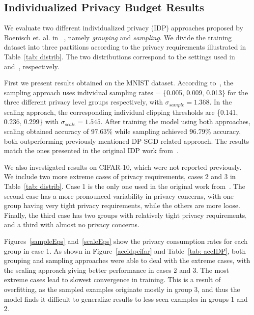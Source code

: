 \subsection{Individualized Privacy Budget Results}
We evaluate two different individualized privacy (IDP) approaches proposed by Boenisch et. al. in ~\cite{haveit}, namely {\em grouping} and {\em sampling}. We divide the training dataset into three partitions according to the privacy requirements illustrated in Table~\ref{tab: distrib}. The two distributions correspond to the settings used in~\cite{haveit} and~\cite{haveit2}, respectively. 

First we present results obtained on the MNIST dataset. 
According to~\cite{haveit}, the sampling approach uses individual sampling rates = \{0.005, 0.009, 0.013\} for the three different privacy level groups respectively, with $\sigma_{sample}=1.368$. In the scaling approach, the corresponding individual clipping thresholds are \{0.141, 0.236, 0.299\} with $\sigma_{scale}=1.545$. After training the model using both approaches, scaling obtained accuracy of $97.63$\% while sampling achieved $96.79$\% accuracy, both outperforming previously mentioned DP-SGD related approach. The results match the ones presented in the original IDP work from~\cite{haveit}.

We also investigated results on CIFAR-10, which were not reported previously. We include two more extreme cases of privacy requirements, cases 2 and 3 in Table~\ref{tab: distrib}. Case 1 is the only one used in the original work from~\cite{haveit}. The second case has a more pronounced variability in privacy concerns, with one group having very tight privacy requirements, while the others are more loose. Finally, the third case has two groups with relatively tight privacy requirements, and a third with almost no privacy concerns. 

Figures~\ref{sampleEps} and~\ref{scaleEps} show the privacy consumption rates for each group in case 1. As shown in Figure~\ref{accidpcifar} and Table~\ref{tab: accIDP}, both grouping and sampling approaches were able to deal with the extreme cases, with the scaling approach giving better performance in cases 2 and 3. The most extreme cases lead to slowest convergence in training. This is a result of overfitting, as the sampled examples originate mostly in group 3, and thus the model finds it difficult to generalize results to less seen examples in groups 1 and 2. 

